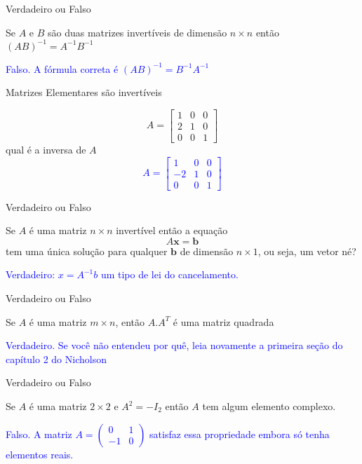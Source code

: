 \documentclass{beamer}
\begin{document}
\begin{frame}{Verdadeiro ou Falso}
  \begin{block}{2}
  Se $A$ e $B$ são duas matrizes invertíveis de dimensão
  $n\times n$ então $(AB)^{-1} = A^{-1}B^{-1}$

  \textcolor{blue}{Falso. A fórmula correta é $(AB)^{-1}=B^{-1}A^{-1}$}
\end{block}
\end{frame}



\begin{frame}{ Matrizes Elementares são invertíveis}

$$ A= \begin{bmatrix}
  1 & 0 & 0 \\
  2 & 1 & 0 \\
  0 & 0 & 1
\end{bmatrix}$$
qual é a inversa de $A$ \pause 
\textcolor{blue}{
$$ A= \begin{bmatrix}
  1 & 0 & 0 \\
  -2 & 1 & 0 \\
  0 & 0 & 1
\end{bmatrix}$$}
\end{frame}


\begin{frame}{Verdadeiro ou Falso}
  \begin{block}{3}
 Se $A$ é uma matriz $n\times n$ invertível então a equação 
 $$ A\mathbf{x} = \mathbf{b} $$
 tem uma única solução para qualquer $\mathbf{b}$ de dimensão $n\times 1$, ou seja, um vetor né?
\end{block}

\textcolor{blue}{Verdadeiro: $x = A^{-1}b$ um tipo de lei do cancelamento.}
\end{frame}


\begin{frame}{Verdadeiro ou Falso}
  \begin{block}{4}
    Se $A$ é uma matriz $m\times n$, então $A.A^T$ é uma matriz quadrada 
  
    \textcolor{blue}{Verdadeiro. Se você não entendeu por quê, leia novamente a primeira seção do capítulo 2 do 
    Nicholson}
\end{block}
\end{frame}   

\begin{frame}{Verdadeiro ou Falso}
  \begin{block}{5}
  Se $A$ é uma matriz $2\times 2$ e $A^2=-I_2$ então $A$ tem algum elemento complexo.
\end{block}

\textcolor{blue}{Falso. A matriz $A=\begin{pmatrix}
  0 & 1 \\ -1 & 0 
\end{pmatrix}$ satisfaz essa propriedade embora só tenha elementos reais.}
\end{frame}
\end{document}

